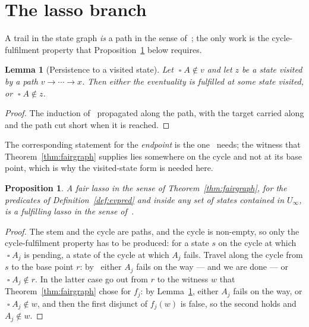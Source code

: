 \documentclass[11pt,a4paper]{article}
\newtheorem{lemma}[theorem]{Lemma}
\newtheorem{proposition}[theorem]{Proposition}
\theoremstyle{definition}
\newcommand{\Always}{\mathop{\square}}
\begin{document}
\section{The lasso branch}\label{sec:lasso}

A trail in the state graph \emph{is} a path in the sense of~\cite[\S6]{m4}; the
only work is the cycle-fulfilment property that
Proposition~\ref{prop:lasso5.3} below requires.

\begin{lemma}[Persistence to a visited state]\label{lem:persistto}
Let $\Always A\notin v$ and let $z$ be a state visited by a path
$v\to\cdots\to x$.  Then either the eventuality is fulfilled at some state
visited, or $\Always A\notin z$.
\end{lemma}

\begin{proof}
The induction of~\cite[Lem.~2.8]{m4} propagated along the path, with the target
carried along and the path cut short when it is reached.
\end{proof}

The corresponding statement for the \emph{endpoint} is the one~\cite{m4} needs;
the witness that Theorem~\ref{thm:fairgraph} supplies lies somewhere on the
cycle and not at its base point, which is why the visited-state form is needed
here.

\begin{proposition}\label{prop:lasso5.3}
A fair lasso in the sense of Theorem~\ref{thm:fairgraph}, for the predicates of
Definition~\ref{def:evpred} and inside any set of states contained in
$U_\infty$, is a fulfilling lasso in the sense of~\cite[Prop.~5.3]{m4}.
\end{proposition}

\begin{proof}
The stem and the cycle are paths, and the cycle is non-empty, so only the
cycle-fulfilment property has to be produced: for a state $s$ on the cycle at
which $\Always A_j$ is pending, a state of the cycle at which $A_j$ fails.
Travel along the cycle from $s$ to the base point $r$: by~\cite[Lem.~2.8]{m4}
either $A_j$ fails on the way --- and we are done --- or $\Always A_j\notin r$.
In the latter case go out from $r$ to the witness $w$ that
Theorem~\ref{thm:fairgraph} chose for $f_j$: by Lemma~\ref{lem:persistto},
either $A_j$ fails on the way, or $\Always A_j\notin w$, and then the first
disjunct of $f_j(w)$ is false, so the second holds and $A_j\notin w$.
\end{proof}
\end{document}
